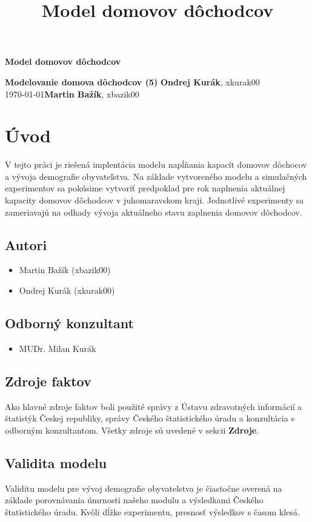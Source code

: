 \documentclass[a4paper, 11pt]{article}
\title{Model domovov dôchodcov}
\begin{document}
\begin{center}
\Large \textbf{Model domovov dôchodcov}
\end{center}
\noindent
\large{\textbf{Modelovanie domova dôchodcov (5)}} \hfill \textbf{Ondrej Kurák}, xkurak00 \\
\today \hfill \textbf{Martin Bažík}, xbazik00 \\


\section{Úvod}
V tejto práci je riešená implentácia modelu\cite[str. 7]{IMS} napĺňania kapacít domovov dôchocov a vývoja demografie obyvateľstva. Na základe vytvoreného modelu a simulačných experimentov\cite[str. 8]{IMS} sa pokúsime vytvoriť predpoklad pre rok naplnenia aktuálnej kapacity domovov dôchodcov v juhomaravskom kraji. Jednotlivé experimenty sa zameriavajú na odhady vývoja aktuálneho stavu zaplnenia domovov dôchodcov.
\subsection{Autori}
\begin{itemize}
\item Martin Bažík (xbazik00)
\item Ondrej Kurák (xkurak00)
\end{itemize}
\subsection{Odborný konzultant}
\begin{itemize}
\item MUDr. Milan Kurák
\end{itemize}
\subsection{Zdroje faktov}
Ako hlavné zdroje faktov boli použité správy z Ústavu zdravotných informácií a štatistýk Českej republiky\cite{demografia}\cite{domovy}, správy Českého štatistického úradu\cite{zomreli} a konzultácia s odborným konzultantom. Všetky zdroje sú uvedené v sekcii \textbf{Zdroje}.  
\subsection{Validita modelu}
Validitu modelu\cite[str. 37]{IMS} pre vývoj demografie obyvatelstva je čiastočne overená na základe porovnávania úmrnosti našeho modulu a výsledkami Českého štatistického úradu\cite{lifet}. Kvôli dĺžke experimentu, presnosť výsledkov s časom klesá.
\end{document}
